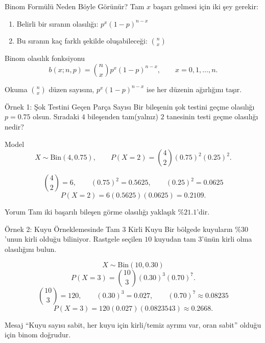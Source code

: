 \documentclass[light]{lutbeamer}
\begin{document}
\begin{frame}{Binom Formülü Neden Böyle Görünür?}
    \scriptsize
    Tam \(x\) başarı gelmesi için iki şey gerekir:
    \begin{enumerate}
        \item Belirli bir sıranın olasılığı: \(p^x(1-p)^{n-x}\)
        \item Bu sıranın kaç farklı şekilde oluşabileceği: \(\binom{n}{x}\)
    \end{enumerate}

    \begin{block}{Binom olasılık fonksiyonu}
        \[
        b(x;n,p)=\binom{n}{x}p^x(1-p)^{n-x},
        \qquad x=0,1,\dots,n.
        \]
    \end{block}

    \begin{block}{Okuma}
        \(\binom{n}{x}\) düzen sayısını, \(p^x(1-p)^{n-x}\) ise her düzenin ağırlığını taşır.
    \end{block}
\end{frame}

\begin{frame}{Örnek 1: Şok Testini Geçen Parça Sayısı}
    \small
    Bir bileşenin şok testini geçme olasılığı \(p=0.75\) olsun. Sıradaki \(4\) bileşenden tam(yalnız) \(2\) tanesinin testi geçme olasılığı nedir?

    \vspace{0.2cm}
    \begin{block}{Model}
        \[
        X \sim \mathrm{Bin}(4,0.75), \qquad P(X=2)=\binom{4}{2}(0.75)^2(0.25)^2.
        \]
    \end{block}

    \[
    \binom{4}{2}=6,\qquad (0.75)^2=0.5625,\qquad (0.25)^2=0.0625
    \]
    \[
    P(X=2)=6(0.5625)(0.0625)=0.2109.
    \]

    \begin{exampleblock}{Yorum}
        Tam iki başarılı bileşen görme olasılığı yaklaşık \(\%21.1\)'dir.
    \end{exampleblock}
\end{frame}

\begin{frame}{Örnek 2: Kuyu Örneklemesinde Tam 3 Kirli Kuyu}
    \small
    Bir bölgede kuyuların \(\%30\)'unun kirli olduğu biliniyor. Rastgele seçilen \(10\) kuyudan tam \(3\)'ünün kirli olma olasılığını bulun.

    \vspace{0.2cm}
    \[
    X \sim \mathrm{Bin}(10,0.30)
    \]
    \[
    P(X=3)=\binom{10}{3}(0.30)^3(0.70)^7.
    \]
    \[
    \binom{10}{3}=120,\qquad (0.30)^3=0.027,\qquad (0.70)^7\approx 0.08235
    \]
    \[
    P(X=3)=120(0.027)(0.0823543)\approx 0.2668.
    \]

    \begin{exampleblock}{Mesaj}
        ``Kuyu sayısı sabit, her kuyu için kirli/temiz ayrımı var, oran sabit'' olduğu için binom doğrudur.
    \end{exampleblock}
\end{frame}
\end{document}
